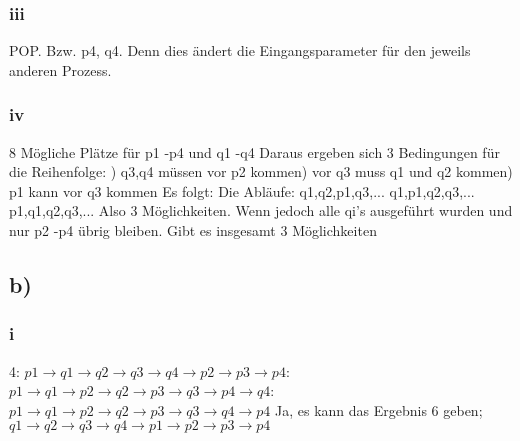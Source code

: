 \documentclass[12pt,pdftex,a4paper]{article}
\begin{document}
\subsubsection*{iii}
POP. Bzw. p4, q4. Denn dies ändert die Eingangsparameter für den jeweils anderen Prozess.\newline
\subsubsection*{iv}
8 Mögliche Plätze für p1 -p4 und q1 -q4 \newline
Daraus ergeben sich 3 Bedingungen für die Reihenfolge: ) q3,q4 müssen vor p2 kommen) vor q3 muss q1 und q2 kommen) p1 kann vor q3 kommen \newline\newline
Es folgt:\newline\newline
Die Abläufe:\newline
q1,q2,p1,q3,...\newline
q1,p1,q2,q3,...\newline
p1,q1,q2,q3,...\newline\newline
Also 3 Möglichkeiten.\newline
Wenn jedoch alle qi's ausgeführt wurden und nur p2 -p4 übrig bleiben. Gibt es 	insgesamt 3 Möglichkeiten\newline

\subsection*{b)}
 
\subsubsection*{i}
4: $p1 \rightarrow q1 \rightarrow q2 \rightarrow q3 \rightarrow q4 \rightarrow p2 \rightarrow p3 \rightarrow p4$: $p1 \rightarrow q1 \rightarrow p2 \rightarrow q2 \rightarrow p3 \rightarrow q3 \rightarrow p4 \rightarrow q4$: $p1 \rightarrow q1 \rightarrow p2 \rightarrow q2 \rightarrow p3 \rightarrow q3 \rightarrow q4 \rightarrow p4$\newline\newline
Ja, es kann das Ergebnis 6 geben;\newline\newline
$q1 \rightarrow q2 \rightarrow q3 \rightarrow q4 \rightarrow p1 \rightarrow p2 \rightarrow p3 \rightarrow p4$\newline
\end{document}
